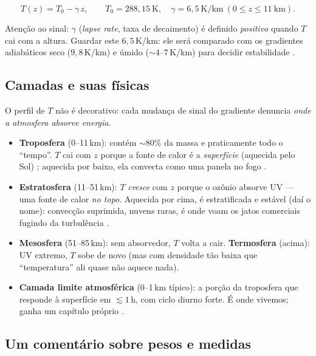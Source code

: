 \documentclass[11pt]{article}
\begin{document}
\begin{formalivro}
\[ T(z) = T_0 - \gamma\, z, \qquad T_0 = 288{,}15\ \mathrm{K},\quad
\gamma = 6{,}5\ \mathrm{K/km}\ (0 \le z \le 11\ \mathrm{km}). \]
\end{formalivro}

Atenção ao sinal: $\gamma$ (\emph{lapse rate}, taxa de decaimento) é definido
\emph{positivo} quando $T$ cai com a altura. Guardar este $6{,}5$\,K/km: ele
será comparado com os gradientes adiabáticos seco ($9{,}8$\,K/km) e úmido
($\sim 4$--$7$\,K/km) para decidir estabilidade  .

\subsection{Camadas e suas físicas}

O perfil de $T$ não é decorativo: cada mudança de sinal do gradiente denuncia
\emph{onde a atmosfera absorve energia}.

\begin{itemize}
  \item \textbf{Troposfera} (0--11\,km): contém $\sim 80\%$ da massa e
  praticamente todo o ``tempo''. $T$ cai com $z$ porque a fonte de calor é a
  \emph{superfície} (aquecida pelo Sol) ;
  aquecida por baixo, ela convecta como uma panela no fogo
  .
  \item \textbf{Estratosfera} (11--51\,km): $T$ \emph{cresce} com $z$ porque o
  ozônio absorve UV — uma fonte de calor \emph{no topo}. Aquecida por cima,
  é estratificada e estável (daí o nome): convecção suprimida, nuvens raras,
  é onde voam os jatos comerciais fugindo da turbulência
  .
  \item \textbf{Mesosfera} (51--85\,km): sem absorvedor, $T$ volta a cair.
  \textbf{Termosfera} (acima): UV extremo, $T$ sobe de novo (mas com
  densidade tão baixa que ``temperatura'' ali quase não aquece nada).
  \item \textbf{Camada limite atmosférica} (0--1\,km típico): a porção da
  troposfera que responde à superfície em $\lesssim 1$\,h, com ciclo diurno
  forte. É onde vivemos; ganha um capítulo próprio .
\end{itemize}

\subsection{Um comentário sobre pesos e medidas}
\end{document}
